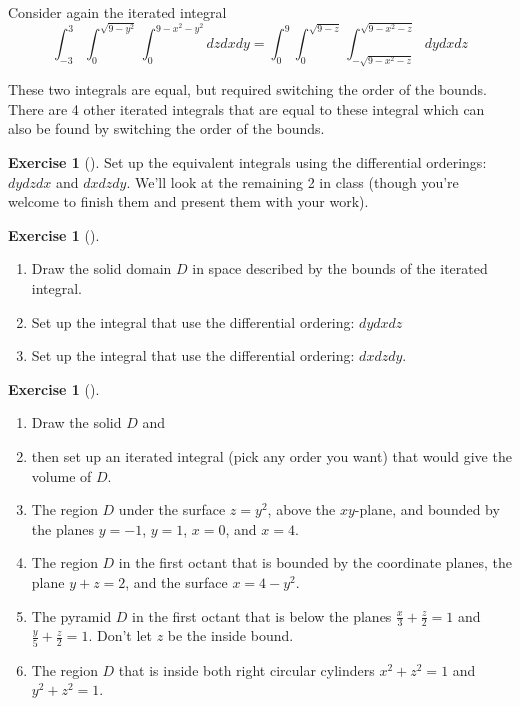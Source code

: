 \documentclass[10pt,]{book}
\theoremstyle{plain}
\theoremstyle{definition}
\theoremstyle{definition}
\theoremstyle{definition}
\theoremstyle{definition}
\newtheorem{exploration}[project]{Exercise}
\theoremstyle{definition}
\numberwithin{equation}{section}
\newcommand{\ds}{\displaystyle}
\begin{document}
%
\par
Consider again the iterated integral%
\begin{equation*}
\ds \int_{-3}^3 \int_0^{\sqrt{9-y^2}}\int_0^{9-x^2-y^2} dzdxdy = \int_0^9\int_0^{\sqrt{9-z}}\int_{-\sqrt{9-x^2-z}}^{\sqrt{9-x^2-z}} dydxdz
\end{equation*}
%
\par
These two integrals are equal, but required switching the order of the bounds. There are 4 other iterated integrals that are equal to these integral which can also be found by switching the order of the bounds.%
\begin{exploration}[]\label{exploration-296}
Set up the equivalent integrals using the differential orderings: \(dydzdx\) and \(dxdzdy\). We'll look at the remaining 2 in class (though you're welcome to finish them and present them with your work).%
\end{exploration}
\begin{exploration}[]\label{exploration-297}
\leavevmode%
\begin{enumerate}[font=\bfseries,label=(\alph*),ref=\alph*]
\item\label{task-811} Draw the solid domain \(D\) in space described by the bounds of the iterated integral.%
\item\label{task-812} Set up the integral that use the differential ordering: \(dydxdz\)%
\item\label{task-813} Set up the integral that use the differential ordering: \(dxdzdy\).%
\end{enumerate}
\end{exploration}
\begin{exploration}[]\label{exploration-298}
\leavevmode%
\begin{enumerate}[font=\bfseries,label=(\alph*),ref=\alph*]
\item\label{task-814} Draw the solid \(D\) and%
\item\label{task-815} then set up an iterated integral (pick any order you want) that would give the volume of \(D\).%
\item\label{task-816} The region \(D\) under the surface \(z=y^2\), above the \(xy\)-plane, and bounded by the planes \(y=-1\), \(y=1\), \(x=0\), and \(x=4\).%
\item\label{task-817} The region \(D\) in the first octant that is bounded by the coordinate planes, the plane \(y+z=2\), and the surface \(x=4-y^2\).%
\item\label{task-818} The pyramid \(D\) in the first octant that is below the planes \(\ds\frac{x}{3}+\frac{z}{2}=1\) and \(\ds\frac{y}{5}+\frac{z}{2}=1\). Don't let \(z\) be the inside bound.%
%
\item\label{task-819} The region \(D\) that is inside both right circular cylinders \(x^2+z^2=1\) and \(y^2+z^2=1\).%
\end{enumerate}
\end{exploration}
\end{document}
